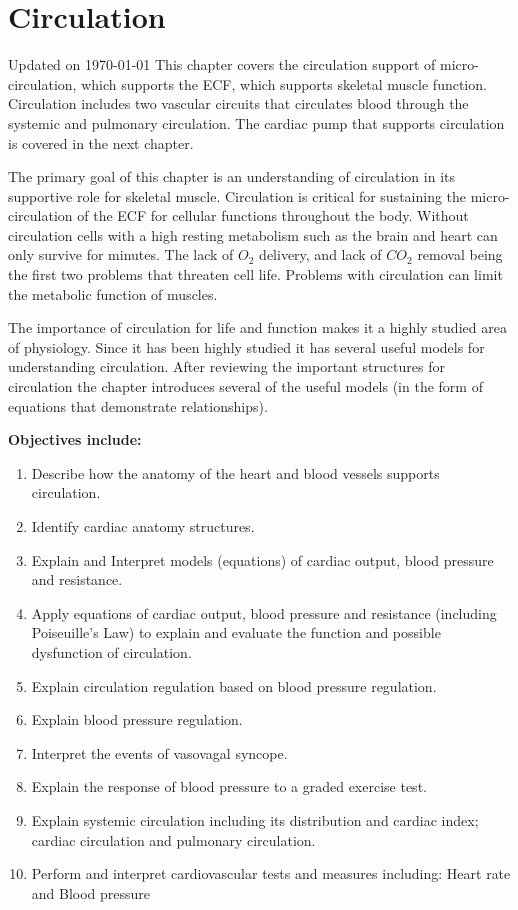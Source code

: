 
\chapter{Circulation}\label{chp:circulation}
Updated on \today
\minitoc
This chapter covers the circulation support of micro-circulation, which supports the ECF, which supports skeletal muscle function. Circulation includes two vascular circuits that circulates blood through the systemic and pulmonary circulation. The cardiac pump that supports circulation is covered in the next chapter.  

The primary goal of this chapter is an understanding of circulation in its supportive role for skeletal muscle. Circulation is critical for sustaining the micro-circulation of the ECF for cellular functions throughout the body. Without circulation cells with a high resting metabolism such as the brain and heart can only survive for minutes. The lack of $O_2$ delivery, and lack of $CO_2$ removal being the first two problems that threaten cell life. Problems with circulation can limit the metabolic function of muscles.   

The importance of circulation for life and function makes it a highly studied area of physiology. Since it has been highly studied it has several useful models for understanding circulation. After reviewing the important structures for circulation the chapter introduces several of the useful models (in the form of equations that demonstrate relationships).


\vspace{5mm}
\begin{svgraybox}
\textbf{Objectives include:}
\begin{enumerate}
    \item Describe how the anatomy of the heart and blood vessels supports circulation. 
    \item Identify cardiac anatomy structures.
    \item Explain and Interpret models (equations) of cardiac output, blood pressure and resistance.
    \item Apply equations of cardiac output, blood pressure and resistance (including Poiseuille's Law) to explain and evaluate the function and possible dysfunction of circulation.
    \item Explain circulation regulation based on blood pressure regulation.
    \item Explain blood pressure regulation.
    \item Interpret the events of vasovagal syncope.
    \item Explain the response of blood pressure to a graded exercise test.
    \item Explain systemic circulation including its distribution and cardiac index; cardiac circulation and pulmonary circulation.
    \item Perform and interpret cardiovascular tests and measures including: Heart rate and Blood pressure
\end{enumerate}
\end{svgraybox}

